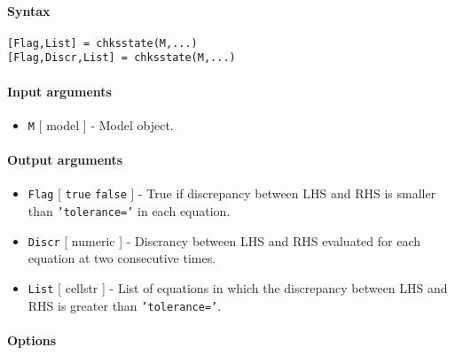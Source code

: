 


	\paragraph{Syntax}\label{syntax}

\begin{verbatim}
[Flag,List] = chksstate(M,...)
[Flag,Discr,List] = chksstate(M,...)
\end{verbatim}

\paragraph{Input arguments}\label{input-arguments}

\begin{itemize}
\itemsep1pt\parskip0pt
\item
  \texttt{M} {[} model {]} - Model object.
\end{itemize}

\paragraph{Output arguments}\label{output-arguments}

\begin{itemize}
\item
  \texttt{Flag} {[} \texttt{true} \textbar{} \texttt{false} {]} - True
  if discrepancy between LHS and RHS is smaller than
  \texttt{'tolerance='} in each equation.
\item
  \texttt{Discr} {[} numeric {]} - Discrancy between LHS and RHS
  evaluated for each equation at two consecutive times.
\item
  \texttt{List} {[} cellstr {]} - List of equations in which the
  discrepancy between LHS and RHS is greater than \texttt{'tolerance='}.
\end{itemize}

\paragraph{Options}\label{options}

